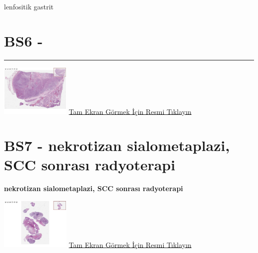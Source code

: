 \documentclass[
  letterpaper,
  DIV=11,
  numbers=noendperiod]{scrreprt}
\begin{document}
\begin{tcolorbox}[enhanced jigsaw, breakable, opacitybacktitle=0.6, arc=.35mm, colbacktitle=quarto-callout-tip-color!10!white, colback=white, toptitle=1mm, left=2mm, opacityback=0, colframe=quarto-callout-tip-color-frame, titlerule=0mm, rightrule=.15mm, bottomrule=.15mm, toprule=.15mm, bottomtitle=1mm, title=\textcolor{quarto-callout-tip-color}{\faLightbulb}\hspace{0.5em}{Tanı}, coltitle=black, leftrule=.75mm]

lenfositik gastrit

\end{tcolorbox}

\hypertarget{sec-BS6}{%
\section{BS6 -}\label{sec-BS6}}

\begin{center}\rule{0.5\linewidth}{0.5pt}\end{center}

\href{https://images.patolojiatlasi.com/BS6/HE.html}{\includegraphics[width=0.25\textwidth,height=\textheight]{./screenshots/thumbnail_BS6-HE.png}}
\href{https://images.patolojiatlasi.com/BS6/HE.html}{Tam Ekran Görmek
İçin Resmi Tıklayın}

\hypertarget{sec-BS7}{%
\section{BS7 - nekrotizan sialometaplazi, SCC sonrası
radyoterapi}\label{sec-BS7}}

\textbf{nekrotizan sialometaplazi, SCC sonrası radyoterapi}

\href{https://images.patolojiatlasi.com/BS7/HE.html}{\includegraphics[width=0.25\textwidth,height=\textheight]{./screenshots/thumbnail_BS7-HE.png}}
\href{https://images.patolojiatlasi.com/BS7/HE.html}{Tam Ekran Görmek
İçin Resmi Tıklayın}
\end{document}
